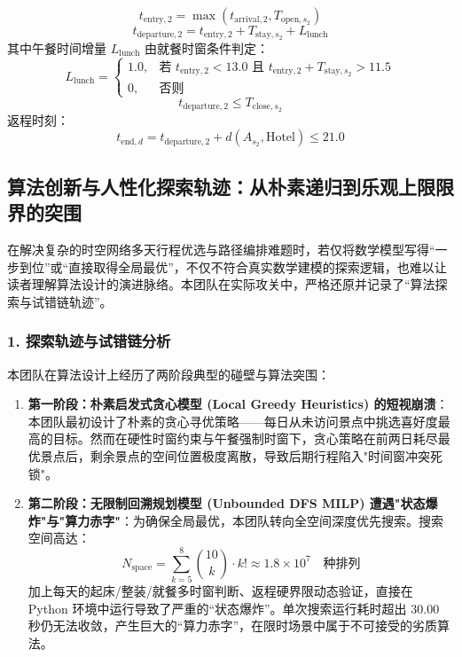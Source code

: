 \documentclass{cumcmthesis}
\begin{document}
\begin{enumerate}
\begin{equation}
t_{\text{entry}, 2} = \max\left( t_{\text{arrival}, 2}, T_{\text{open}, s_2} \right)
\end{equation}
\begin{equation}
t_{\text{departure}, 2} = t_{\text{entry}, 2} + T_{\text{stay}, s_2} + L_{\text{lunch}}
\end{equation}
其中午餐时间增量 $L_{\text{lunch}}$ 由就餐时窗条件判定：
\begin{equation}
L_{\text{lunch}} = \begin{cases}
1.0, & \text{若 } t_{\text{entry}, 2} < 13.0 \text{ 且 } t_{\text{entry}, 2} + T_{\text{stay}, s_2} > 11.5 \\
0, & \text{否则}
\end{cases}
\end{equation}
\begin{equation}
t_{\text{departure}, 2} \le T_{\text{close}, s_2}
\end{equation}
返程时刻：
\begin{equation}
t_{\text{end}, d} = t_{\text{departure}, 2} + d(A_{s_2}, \text{Hotel}) \le 21.0
\end{equation}
\end{enumerate}
\subsection{算法创新与人性化探索轨迹：从朴素递归到乐观上限限界的突围}
在解决复杂的时空网络多天行程优选与路径编排难题\cite{ref3, ref4}时，若仅将数学模型写得“一步到位”或“直接取得全局最优”，不仅不符合真实数学建模的探索逻辑，也难以让读者理解算法设计的演进脉络。本团队在实际攻关中，严格还原并记录了“算法探索与试错链轨迹”。

\subsubsection{1. 探索轨迹与试错链分析}
本团队在算法设计上经历了两阶段典型的碰壁与算法突围：
\begin{enumerate}
\item \textbf{第一阶段：朴素启发式贪心模型 (Local Greedy Heuristics) 的短视崩溃}：本团队最初设计了朴素的贪心寻优策略——每日从未访问景点中挑选喜好度最高的目标。然而在硬性时窗约束与午餐强制时窗下，贪心策略在前两日耗尽最优景点后，剩余景点的空间位置极度离散，导致后期行程陷入"时间窗冲突死锁"。
\item \textbf{第二阶段：无限制回溯规划模型 (Unbounded DFS MILP) 遭遇"状态爆炸"与"算力赤字"}：为确保全局最优，本团队转向全空间深度优先搜索。搜索空间高达：
\begin{equation}
N_{\text{space}} = \sum_{k=5}^{8} \binom{10}{k} \cdot k! \approx 1.8 \times 10^7 \quad \text{种排列}
\end{equation}
加上每天的起床/整装/就餐多时窗判断、返程硬界限动态验证，直接在 Python 环境中运行导致了严重的“状态爆炸”。单次搜索运行耗时超出 30.00 秒仍无法收敛，产生巨大的“算力赤字”，在限时场景中属于不可接受的劣质算法。
\end{enumerate}
\end{document}
